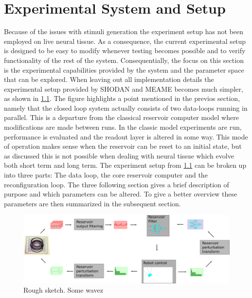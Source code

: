 \chapter{Experimental System and Setup}
Because of the issues with stimuli generation the experiment setup has not been
employed on live neural tissue.
As a consequence, the current experimental setup is designed to be easy to
modify whenever testing becomes possible and to verify functionality of the rest
of the system.
Consequentially, the focus on this section is the experimental capabilities
provided by the system and the parameter space that can be explored.
When leaving out all implementation details the experimental setup provided by
SHODAN and MEAME becomes much simpler, as shown in \ref{figExperimentLoop}.
The figure highlights a point mentioned in the previos section, namely that the
closed loop system actually consists of two data-loops running in parallel.
This is a departure from the classical reservoir computer model where
modifications are made between runs.
In the classic model experiments are run, performance is evaluated and the
readout layer is altered in some way.
This mode of operation makes sense when the reservoir can be reset to an initial
state, but as discussed this is not possible when dealing with neural tissue
which evolve both short term and long term.
The experiment setup from \ref{figExperimentLoop} can be broken up into three
parts: The data loop, the core reservoir computer and the reconfiguration loop.
The three following section gives a brief description of purpose and which
parameters can be altered.
To give a better overview these parameters are then summarized in the subsequent
section.
\begin{figure}[h!]
  \centering
  \includegraphics[width=1\textwidth]{fig/experimentLoop.png}
  \caption{Rough sketch.
    Some wavez
  }
  \label{figExperimentLoop}
\end{figure}
%
